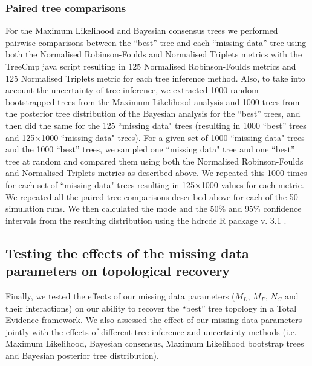 \subsubsection*{Paired tree comparisons}
\label{tree_comparisons}
For the Maximum Likelihood and Bayesian consensus trees we performed pairwise comparisons between the ``best'' tree and each ``missing-data'' tree using both the Normalised Robinson-Foulds and Normalised Triplets metrics with the TreeCmp java script \citep{Bogdanowicz2012} resulting in 125 Normalised Robinson-Foulds metrics and 125 Normalised Triplets metric for each tree inference method.
Also, to take into account the uncertainty of tree inference, we extracted 1000 random bootstrapped trees from the Maximum Likelihood analysis and 1000 trees from the posterior tree distribution of the Bayesian analysis for the ``best'' trees, and then did the same for the 125 ``missing data" trees (resulting in 1000 ``best'' trees and 125$\times$1000 ``missing data" trees). 
For a given set of 1000 ``missing data" trees and the 1000 ``best'' trees, we sampled one ``missing data" tree and one ``best'' tree at random and compared them using both the Normalised Robinson-Foulds and Normalised Triplets metrics as described above.
We repeated this 1000 times for each set of ``missing data" trees resulting in 125$\times$1000 values for each metric.
We repeated all the paired tree comparisons described above for each of the 50 simulation runs.
We then calculated the mode and the 50\% and 95\% confidence intervals from the resulting distribution using the hdrcde R package v. 3.1 \citep{hdrcde}.

\subsection{Testing the effects of the missing data parameters on topological recovery}
Finally, we tested the effects of our missing data parameters ($M_{L}$, $M_{F}$, $N_{C}$ and their interactions) on our ability to recover the ``best'' tree topology in a Total Evidence framework.
We also assessed the effect of our missing data parameters jointly with the effects of different tree inference and uncertainty methods (i.e. Maximum Likelihood, Bayesian consensus, Maximum Likelihood bootstrap trees and Bayesian posterior tree distribution).

